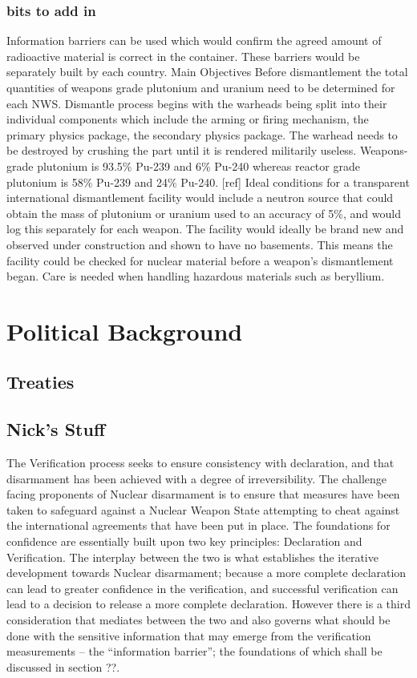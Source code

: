 \documentclass[twocolumn,a4paper]{article}
\begin{document}
\subsubsection{bits to add in}
Information barriers can be used which would confirm the agreed amount of 
radioactive material is correct in the container. These barriers would be 
separately built by each country.
Main Objectives
Before dismantlement the total quantities of weapons grade plutonium and 
uranium need to be determined for each NWS. 
Dismantle process begins with the warheads being split into their individual 
components which include the arming or firing mechanism, the primary physics 
package, the secondary physics package.
The warhead needs to be destroyed by crushing the part until it is rendered 
militarily useless.
Weapons-grade plutonium is 93.5\% Pu-239 and 6\% Pu-240 whereas reactor grade 
plutonium is 58\% Pu-239 and 24\% Pu-240. [ref]
Ideal conditions for a transparent international dismantlement facility would 
include a neutron source that could obtain the mass of plutonium or uranium 
used to an accuracy of 5\%, and would log this separately for each weapon. 
The facility would ideally be brand new and observed under construction and 
shown to have no basements. This means the facility could be checked for 
nuclear material before a weapon’s dismantlement began. 
Care is needed when handling hazardous materials such as beryllium.

\section{Political Background}
\subsection{Treaties}

\subsection{Nick's Stuff}
The Verification process seeks to ensure consistency with declaration, 
and that disarmament has been achieved with a degree of irreversibility. 
The challenge facing proponents of Nuclear disarmament is to ensure that 
measures have been taken to safeguard against a Nuclear Weapon State 
attempting to cheat against the international agreements that have been 
put in place. The foundations for confidence are essentially built upon 
two key principles: Declaration and Verification. The interplay between 
the two is what establishes the iterative development towards Nuclear 
disarmament; because a more complete declaration can lead to greater 
confidence in the verification, and successful verification can lead to a 
decision to release a more complete declaration. However there is a third 
consideration that mediates between the two and also governs what should be 
done with the sensitive information that may emerge from the verification 
measurements -- the ``information barrier''; the foundations of which shall 
be discussed in section ??. 
\end{document}
